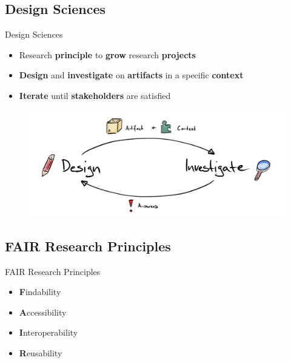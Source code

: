 \documentclass{beamer}
\begin{document}
\subsection*{Design Sciences}
\begin{frame}{Design Sciences \cite{wieringa}}
	\begin{itemize}
		\item Research \textbf{principle} to \textbf{grow} research \textbf{projects}\bigskip
		\item \textbf{Design} and \textbf{investigate} on \textbf{artifacts} in a specific \textbf{context}\bigskip
		\item \textbf{Iterate} until \textbf{stakeholders} are satisfied
	\end{itemize}

	\begin{figure}
		\includegraphics[width=.8\textwidth]{assets/slides/design-sciences-process.png}
	\end{figure}
\end{frame}


\subsection*{FAIR Research Principles}
\begin{frame}{FAIR Research Principles \cite{wilkinson:2016} \cite{2019arXiv190805986H}}
	\begin{itemize}
		\item \textbf{F}indability\bigskip
		\item \textbf{A}ccessibility\bigskip
		\item \textbf{I}nteroperability\bigskip
		\item \textbf{R}eusability
	\end{itemize}
\end{frame}
\end{document}
